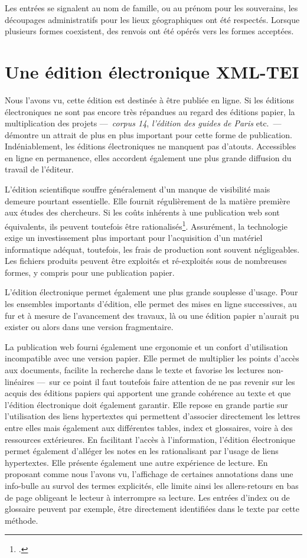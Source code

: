 \documentclass[12pt,a4paper]{book} %
\begin{document}
Les entrées se signalent au nom de famille, ou au prénom pour les souverains, les découpages administratifs pour les lieux géographiques ont été respectés. Lorsque plusieurs formes coexistent, des renvois ont été opérés vers les formes acceptées.

\chapter{Une édition électronique XML-TEI}

Nous l'avons vu, cette édition est destinée à être publiée en ligne. Si les éditions électroniques ne sont pas encore très répandues au regard des éditions papier, la multiplication des projets  ---~\textit{corpus 14}, \textit{l'édition des guides de Paris} etc.~--- démontre un attrait de plus en plus important pour cette forme de publication. Indéniablement, les éditions électroniques ne manquent  pas d'atouts. Accessibles en ligne en permanence, elles accordent également  une plus grande diffusion du travail de l'éditeur.

L'édition scientifique souffre généralement d'un manque de visibilité mais demeure pourtant essentielle. Elle fournit régulièrement de la matière première aux études des chercheurs. Si les coûts inhérents à une publication web sont équivalents, ils peuvent toutefois être rationalisés\footcite{poupeau_ledition_2005}. Assurément, la technologie exige  un investissement plus important pour l'acquisition d'un matériel informatique adéquat, toutefois, les frais de production sont  souvent négligeables. Les fichiers produits peuvent être exploités et ré-exploités sous de nombreuses formes, y compris pour une publication papier.

L'édition électronique permet également une plus grande souplesse d'usage. Pour les ensembles importants d'édition, elle permet des mises en ligne successives, au fur et à mesure de l'avancement des travaux, là ou une édition papier n'aurait pu exister ou alors dans une version fragmentaire.

La publication web fourni également une ergonomie et un confort d'utilisation incompatible avec une version papier. Elle permet de multiplier les points d'accès aux documents, facilite la recherche dans le texte et favorise les lectures non-linéaires ---~sur ce point il faut toutefois faire attention de ne pas revenir sur les acquis des éditions papiers qui apportent une grande cohérence au texte et que l'édition électronique doit également garantir. Elle repose en grande partie sur l'utilisation des liens hypertextes qui permettent d'associer directement les lettres entre elles mais également aux différentes tables, index et glossaires, voire à des ressources extérieures. En facilitant l'accès à l'information, l'édition électronique permet également d'alléger les notes en les rationalisant par l'usage de liens hypertextes. Elle présente également une autre expérience de lecture. En proposant comme nous l'avons vu, l'affichage de certaines annotations dans une info-bulle au survol des termes explicités, elle limite ainsi les allers-retours en bas de page obligeant le lecteur à interrompre  sa lecture. Les entrées d'index ou de glossaire peuvent par exemple, être directement identifiées dans le texte par cette méthode.
\end{document}
